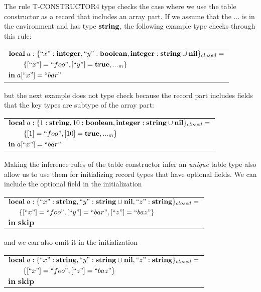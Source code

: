 The rule \textsc{T-CONSTRUCTOR4} type checks the case where we use
the table constructor as a record that includes an array part.
If we assume that the $...$ is in the environment and has type $\mathbf{string}$,
the following example type checks through this rule:
\begin{center}
\begin{tabular}{ll}
\multicolumn{2}{l}{$\mathbf{local} \; a:\{``x":\mathbf{integer}, ``y":\mathbf{boolean}, \mathbf{integer}:\mathbf{string} \cup \mathbf{nil}\}_{closed} =$}\\
& \multicolumn{1}{l}{$\{ [``x"] = ``foo", [``y"] = \mathbf{true}, {...}_{m} \}$}\\
\multicolumn{2}{l}{$\mathbf{in} \; a[``x"] = ``bar"$}
\end{tabular}
\end{center}
but the next example does not type check because the record part
includes fields that the key types are subtype of the array part:
\begin{center}
\begin{tabular}{ll}
\multicolumn{2}{l}{$\mathbf{local} \; a:\{1:\mathbf{string}, 10:\mathbf{boolean}, \mathbf{integer}:\mathbf{string} \cup \mathbf{nil}\}_{closed} =$}\\
& \multicolumn{1}{l}{$\{ [1] = ``foo", [10] = \mathbf{true}, {...}_{m} \}$}\\
\multicolumn{2}{l}{$\mathbf{in} \; a[``x"] = ``bar"$}
\end{tabular}
\end{center}

Making the inference rules of the table constructor infer an \emph{unique}
table type also allow us to use them for initializing record types that
have optional fields.
We can include the optional field in the initialization
\begin{center}
\begin{tabular}{ll}
\multicolumn{2}{l}{$\mathbf{local} \; a:\{``x":\mathbf{string}, ``y":\mathbf{string} \cup \mathbf{nil}, ``z":\mathbf{string}\}_{closed} =$}\\
& \multicolumn{1}{l}{$\{ [``x"] = ``foo", [``y"] = ``bar", [``z"] = ``baz" \}$}\\
\multicolumn{2}{l}{$\mathbf{in} \; \mathbf{skip}$}
\end{tabular}
\end{center}
and we can also omit it in the initialization
\begin{center}
\begin{tabular}{ll}
\multicolumn{2}{l}{$\mathbf{local} \; a:\{``x":\mathbf{string}, ``y":\mathbf{string} \cup \mathbf{nil}, ``z":\mathbf{string}\}_{closed} =$}\\
& \multicolumn{1}{l}{$\{ [``x"] = ``foo", [``z"] = ``baz" \}$}\\
\multicolumn{2}{l}{$\mathbf{in} \; \mathbf{skip}$}
\end{tabular}
\end{center}

